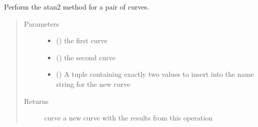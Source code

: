 \documentclass[letterpaper,10pt,english]{sphinxmanual}
\begin{document}
\begin{fulllineitems}
\label{\detokenize{pydv:pydvpy.atan2}}
Perform the atan2 method for a pair of curves.

\begin{sphinxVerbatim}[commandchars=\\\{\}]
  
\end{sphinxVerbatim}

\begin{sphinxVerbatim}[commandchars=\\\{\}]
\PYG{p}{[}\PYG{p}{]} \PYG{p}{[}\PYG{p}{]}   
\end{sphinxVerbatim}

\begin{sphinxVerbatim}[commandchars=\\\{\}]
\PYG{p}{[}\PYG{p}{]} \PYG{p}{[}\PYG{p}{]} \PYG{p}{[} \PYG{p}{]}
\end{sphinxVerbatim}
\begin{quote}\begin{description}
\item[{Parameters}] \leavevmode\begin{itemize}
\item {} 
 () \textendash{} the first curve

\item {} 
 () \textendash{} the second curve

\item {} 
 () \textendash{} A tuple containing exactly two values to insert into the name string for the new curve

\end{itemize}

\item[{Returns}] \leavevmode
curve \textendash{} a new curve with the results from this operation

\end{description}\end{quote}

\end{fulllineitems}
\end{document}
